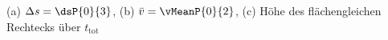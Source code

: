(a) $\Delta s = \dsP{0}{3}$, (b) $\bar v = \vMeanP{0}{2}$, (c) Höhe des flächengleichen Rechtecks über $t_\mathrm{tot}$
